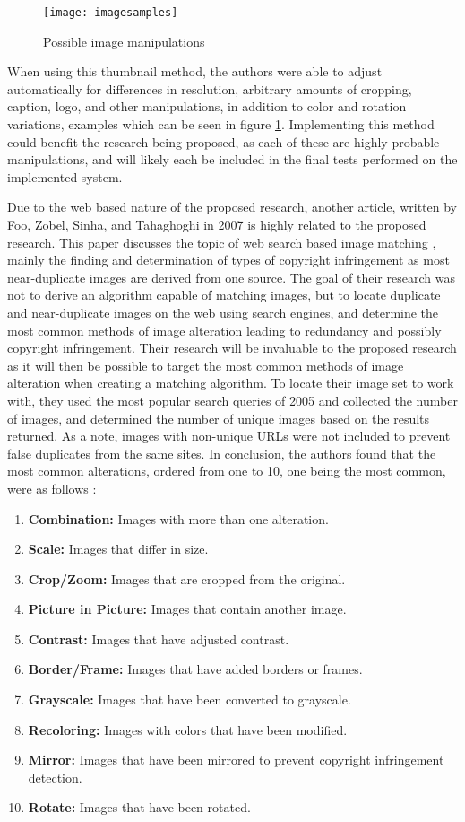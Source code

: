 \documentclass[11pt]{article}
\begin{document}
\begin{figure}[htbp]
\centering
\texttt{[image: imagesamples]}
\caption{Possible image manipulations}
\label{imgsample}
\end{figure}

When using this thumbnail method, the authors were able to adjust automatically for differences in resolution, arbitrary amounts of cropping, caption, logo, and other manipulations, in addition to color and rotation variations, examples which can be seen in figure \ref{imgsample}. Implementing this method could benefit the research being proposed, as each of these are highly probable manipulations, and will likely each be included in the final tests performed on the implemented system.

Due to the web based nature of the proposed research, another article, written by Foo, Zobel, Sinha, and Tahaghoghi in 2007 is highly related to the proposed research. This paper discusses the topic of web search based image matching \cite{Foo:2007}, mainly the finding and determination of types of copyright infringement as most near-duplicate images are derived from one source. The goal of their research was not to derive an algorithm capable of matching images, but to locate duplicate and near-duplicate images on the web using search engines, and determine the most common methods of image alteration leading to redundancy and possibly copyright infringement. Their research will be invaluable to the proposed research as it will then be possible to target the most common methods of image alteration when creating a matching algorithm. To locate their image set to work with, they used the most popular search queries of 2005 and collected the number of images, and determined the number of unique images based on the results returned. As a note, images with non-unique URLs were not included to prevent false duplicates from the same sites. In conclusion, the authors found that the most common alterations, ordered from one to 10, one being the most common, were as follows \cite{Foo:2007}:
\begin{enumerate}
\item
\textbf{Combination:} Images with more than one alteration.
\item
\textbf{Scale:} Images that differ in size.
\item
\textbf{Crop/Zoom:} Images that are cropped from the original.
\item
\textbf{Picture in Picture:} Images that contain another image.
\item
\textbf{Contrast:} Images that have adjusted contrast.
\item
\textbf{Border/Frame:} Images that have added borders or frames.
\item
\textbf{Grayscale:} Images that have been converted to grayscale.
\item
\textbf{Recoloring:} Images with colors that have been modified.
\item
\textbf{Mirror:} Images that have been mirrored to prevent copyright infringement detection.
\item
\textbf{Rotate:} Images that have been rotated.
\end{enumerate}
\end{document}
